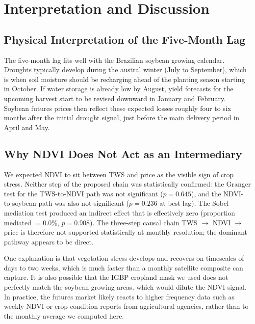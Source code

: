 \documentclass[6pt, twocolumn]{article}
\begin{document}
\FloatBarrier
\section{Interpretation and Discussion}
\label{sec:discussion}

\subsection{Physical Interpretation of the Five-Month Lag}

The five-month lag fits well with the Brazilian soybean growing
calendar. Droughts typically develop during the austral winter
(July to September), which is when soil moisture should be
recharging ahead of the planting season starting in October.
If water storage is already low by August, yield forecasts for
the upcoming harvest start to be revised downward in
January and February. Soybean futures prices then reflect these
expected losses roughly four to six months after the initial
drought signal, just before the main delivery period in April
and May.

\subsection{Why NDVI Does Not Act as an Intermediary}

We expected NDVI to sit between TWS and price as the visible sign
of crop stress. Neither step of the proposed chain was statistically
confirmed: the Granger test for the TWS-to-NDVI path was not
significant ($p = 0.645$), and the NDVI-to-soybean path was also
not significant ($p = 0.236$ at best lag). The Sobel mediation
test produced an indirect effect that is effectively zero
(proportion mediated $= 0.0\%$, $p = 0.908$). The three-step
causal chain TWS $\to$ NDVI $\to$ price is therefore not supported
statistically at monthly resolution; the dominant pathway appears
to be direct.

One explanation is that vegetation stress develops and recovers on
timescales of days to two weeks, which is much faster than a monthly
satellite composite can capture. It is also possible that the IGBP
cropland mask we used does not perfectly match the soybean growing
areas, which would dilute the NDVI signal. In practice, the futures
market likely reacts to higher frequency data such as weekly NDVI or
crop condition reports from agricultural agencies, rather than to
the monthly average we computed here.
\end{document}

